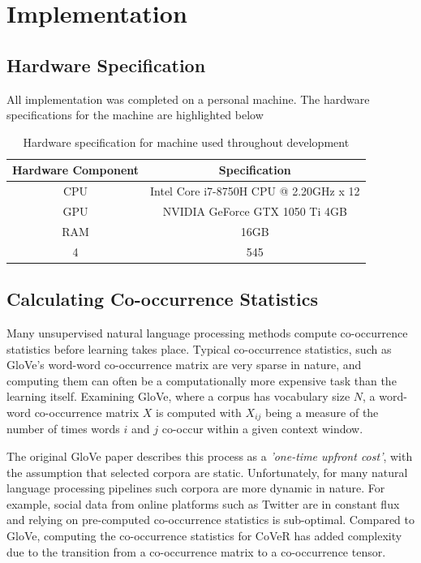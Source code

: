 \chapter{Implementation}
\label{chap:implementation}
\section{Hardware Specification}
All implementation was completed on a personal machine. The hardware specifications for the machine are highlighted below

\begin{table}[h!]
	\centering
	\begin{tabular}{||c | c||} 
		\hline
		Hardware Component & Specification \\ [0.5ex] 
		\hline\hline
		CPU & Intel Core i7-8750H CPU @ 2.20GHz x 12 \\ 
		GPU & NVIDIA GeForce GTX 1050 Ti 4GB \\
		RAM & 16GB \\
		4 & 545 \\ [1ex] 
		\hline
	\end{tabular}
	\caption{Hardware specification for machine used throughout development}
	\label{table:1}
\end{table}
\section{Calculating Co-occurrence Statistics}
Many unsupervised natural language processing methods compute co-occurrence statistics before learning takes place. Typical co-occurrence statistics, such as GloVe's word-word co-occurrence matrix are very sparse in nature, and computing them can often be a computationally more expensive task than the learning itself. Examining GloVe, where a corpus has vocabulary size \(N\), a word-word co-occurrence matrix \(X\) is computed with \(X_{ij}\) being a measure of the number of times words \(i\) and \(j\) co-occur within a given context window. 

\noindent
\newline
The original GloVe paper describes this process as a \textit{'one-time upfront cost'}, with the assumption that selected corpora are static. Unfortunately, for many natural language processing pipelines such corpora are more dynamic in nature. For example, social data from online platforms such as Twitter are in constant flux and relying on pre-computed co-occurrence statistics is sub-optimal. Compared to GloVe, computing the co-occurrence statistics for CoVeR has added complexity due to the transition from a co-occurrence matrix to a co-occurrence tensor. 

